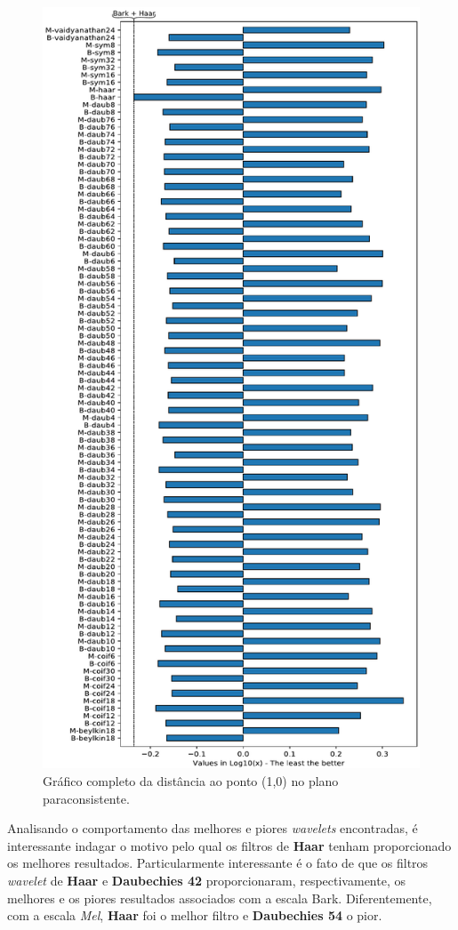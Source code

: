 	\begin{figure}[h]
		\centering
		\includegraphics[width=0.7\linewidth]{images/results/paraconsistentPlane/ParaconsistentFull.pdf}
		\caption{Gráfico completo da distância ao ponto (1,0) no plano paraconsistente.}
		\label{fig:paraconsistentfull}
	\end{figure}

	\par Analisando o comportamento das melhores e piores \textit{wavelets} encontradas, é interessante indagar o motivo pelo qual os filtros de \textbf{Haar} tenham proporcionado os melhores resultados. Particularmente interessante é o fato de que os filtros \textit{wavelet} de \textbf{Haar} e \textbf{Daubechies 42} proporcionaram, respectivamente, os melhores e os piores resultados associados com a escala Bark. Diferentemente, com a escala \textit{Mel}, \textbf{Haar} foi o melhor filtro e \textbf{Daubechies 54} o pior. \\
	
